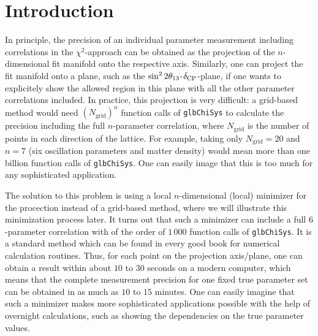 \section{Introduction}

In principle, the precision of an individual parameter measurement including correlations in the $\chi^2$-approach can be obtained as the projection of the $n$-dimensional fit manifold onto the respective axis. Similarly, one can project the fit manifold onto a plane, such as the $\sin^2 2 \theta_{13}$-$\delta_{\mathrm{CP}}$-plane, if one wants to explicitely show the allowed
region in this plane with all the other parameter correlations included. 
In practice, this projection is very difficult: a grid-based method would need $(N_{\mathrm{grid}})^n$ function calls of {\tt glbChiSys} to calculate the precision including the full $n$-parameter correlation, where $N_{\mathrm{grid}}$ is the number of points in each direction of the lattice. For example, taking only $N_{\mathrm{grid}}=20$ and $n=7$ (six oscillation parameters and matter density) would mean more than one billion function calls of {\tt glbChiSys}. One can easily image that this is too much for any sophisticated application.

The solution to this problem is using a local $n$-dimensional (local) minimizer for the procection instead of a grid-based method, where we will
illustrate this minimization process later. It turns out
that such a minimizer can include a full $6$-parameter correlation with of the order of $1\, 000$ function calls of {\tt glbChiSys}. It is a standard method which can be found in every good book for numerical calculation routines. Thus, for each point on the projection axis/plane, one can obtain a result within about $10$ to $30$ seconds on a modern computer, which means that the complete measurement precision for one fixed true parameter set can be obtained in as much as $10$ to $15$ minutes. One can easily imagine that such a minimizer makes more sophisticated applications possible with the help of overnight calculations, such as showing the dependencies on the true parameter values.

